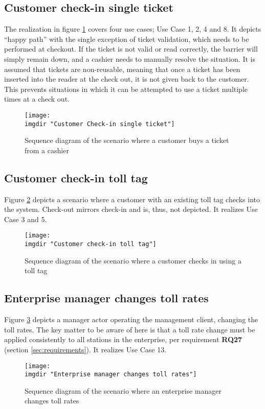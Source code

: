 \subsection{Customer check-in single ticket}
The realization in figure \ref{fig:seq_diag:customer_check_in_single_ticket} covers four use cases; Use Case 1, 2, 4 and 8. It depicts ``happy path'' with the single exception of ticket validation, which needs to be performed at checkout. If the ticket is not valid or read correctly, the barrier will simply remain down, and a cashier needs to manually resolve the situation.
It is assumed that tickets are non-reusable, meaning that once a ticket has been inserted into the reader at the check out, it is not given back to the customer. This prevents situations in which it can be attempted to use a ticket multiple times at a check out.
\begin{figure}%
  \texttt{[image: \\imgdir "Customer Check-in single ticket"]}
  \caption{Sequence diagram of the scenario where a customer buys a ticket from a cashier}
  \label{fig:seq_diag:customer_check_in_single_ticket}
\end{figure}

\subsection{Customer check-in toll tag}
Figure \ref{fig:seq_diag:customer_check_in_toll_tag} depicts a scenario where a customer with an existing toll tag checks into the system. Check-out mirrors check-in and is, thus, not depicted. It realizes Use Case 3 and 5.
\begin{figure} %
  \texttt{[image: \\imgdir "Customer check-in toll tag"]}
  \caption{Sequence diagram of the scenario where a customer checks in using a toll tag}
  \label{fig:seq_diag:customer_check_in_toll_tag}
\end{figure}

\subsection{Enterprise manager changes toll rates}
Figure \ref{fig:seq_diag:enterprise_manager_changes_toll_rates} depicts a manager actor operating the management client, changing the toll rates. The key matter to be aware of here is that a toll rate change must be applied consistently to all stations in the enterprise, per requirement \textbf{RQ27} (section \ref{sec:requirements}). It realizes Use Case 13.
\begin{figure} %
  \texttt{[image: \\imgdir "Enterprise manager changes toll rates"]}
  \caption{Sequence diagram of the scenario where an enterprise manager changes toll rates}
  \label{fig:seq_diag:enterprise_manager_changes_toll_rates}
\end{figure}

